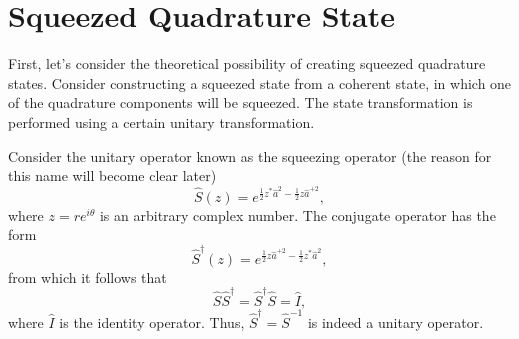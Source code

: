 \section{Squeezed Quadrature State}
First, let's consider the theoretical possibility of creating squeezed
quadrature states. Consider constructing a squeezed state from
a coherent state, in which one of the quadrature
components will be squeezed. The state transformation is performed using
a certain unitary transformation.

Consider the unitary operator known as the squeezing operator
(the reason for this name will become clear later)
\begin{equation}
\hat{S}\left(z\right) = e^{\frac{1}{2}z^{*}\hat{a}^2 -
\frac{1}{2}z\hat{a}^{+2}},
\nonumber
\end{equation}
where $z = r e^{i\theta}$ is an arbitrary complex number.
The conjugate operator has the form
\begin{equation}
\hat{S}^{\dag}\left(z\right) = e^{\frac{1}{2}z\hat{a}^{+2} -
\frac{1}{2}z^{*}\hat{a}^{2}}, 
\nonumber
\end{equation}
from which it follows that
\begin{equation}
\hat{S} \hat{S}^{\dag} = \hat{S}^{\dag} \hat{S} = \hat{I},
\nonumber
\end{equation}
where $\hat{I}$ is the identity operator. Thus, $\hat{S}^{\dag} =
\hat{S}^{-1}$ is indeed a unitary operator.

